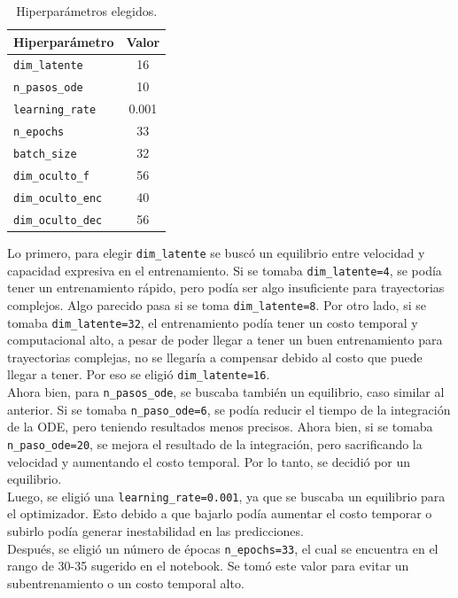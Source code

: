 \documentclass[11pt,letterpaper]{article}
\begin{document}
\begin{table}[H]
\centering
\caption{Hiperparámetros elegidos.}
\label{tab:hiperparametros}
\begin{tabular}{lc}
\toprule
\textbf{Hiperparámetro} & \textbf{Valor} \\
\midrule
\texttt{dim\_latente} & 16 \\
\texttt{n\_pasos\_ode} & 10 \\
\texttt{learning\_rate} & 0.001 \\
\texttt{n\_epochs} & 33 \\
\texttt{batch\_size} & 32 \\
\texttt{dim\_oculto\_f} & 56 \\
\texttt{dim\_oculto\_enc} & 40 \\
\texttt{dim\_oculto\_dec} & 56 \\
\bottomrule
\end{tabular}
\end{table}

Lo primero, para elegir \texttt{dim\_latente} se buscó un equilibrio entre velocidad y capacidad expresiva en el entrenamiento. Si se tomaba \texttt{dim\_latente=4}, se podía tener un entrenamiento rápido, pero podía ser algo insuficiente para trayectorias complejos. Algo parecido pasa si se toma \texttt{dim\_latente=8}. Por otro lado, si se tomaba \texttt{dim\_latente=32}, el entrenamiento podía tener un costo temporal y computacional alto, a pesar de poder llegar a tener un buen entrenamiento para trayectorias complejas, no se llegaría a compensar debido al costo que puede llegar a tener. Por eso se eligió \texttt{dim\_latente=16}.\\

Ahora bien, para \texttt{n\_pasos\_ode}, se buscaba también un equilibrio, caso similar al anterior. Si se tomaba \texttt{n\_paso\_ode=6}, se podía reducir el tiempo de la integración de la ODE, pero teniendo resultados menos precisos. Ahora bien, si se tomaba \texttt{n\_paso\_ode=20}, se mejora el resultado de la integración, pero sacrificando la velocidad y aumentando el costo temporal. Por lo tanto, se decidió por un equilibrio.\\

Luego, se eligió una \texttt{learning\_rate=0.001}, ya que se buscaba un equilibrio para el optimizador. Esto debido a que bajarlo podía aumentar el costo temporar o subirlo podía generar inestabilidad en las predicciones.\\

Después, se eligió un número de épocas \texttt{n\_epochs=33}, el cual se encuentra en el rango de 30-35 sugerido en el notebook. Se tomó este valor para evitar un subentrenamiento o un costo temporal alto.\\
\end{document}
